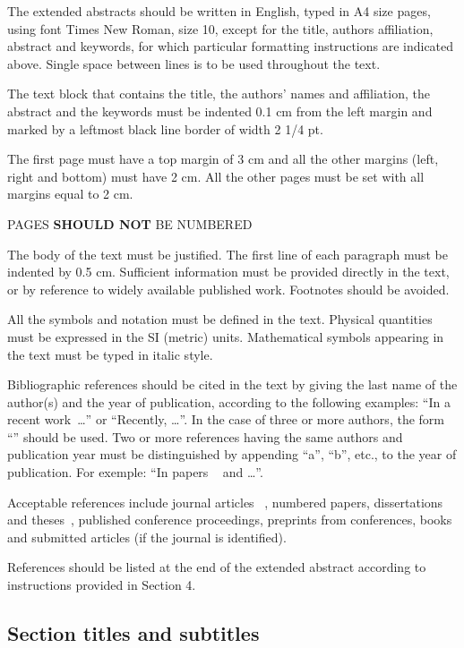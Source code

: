 \documentclass[10pt,fleqn,a4paper,twoside]{article}
\begin{document}
The extended abstracts should be written in English, typed in A4 size pages, using font Times New Roman, size 10, except for the title, authors affiliation, abstract and keywords, for which particular formatting instructions are indicated above. Single space between lines is to be used throughout the text.

The text block that contains the title, the authors' names and affiliation, the abstract and the keywords must be indented 0.1 cm from the left margin and marked by a leftmost black line border of width 2 1/4 pt.

The first page must have a top margin of 3 cm and all the other margins (left, right and bottom) must have 2 cm. All the other pages must be set with all margins equal to 2 cm.

PAGES {\bf SHOULD NOT} BE NUMBERED

The body of the text must be justified. The first line of each paragraph must be indented by 0.5 cm. Sufficient information must be provided directly in the text, or by reference to widely available published work. Footnotes should be avoided.

All the symbols and notation must be defined in the text. Physical quantities must be expressed in the SI (metric) units. Mathematical symbols appearing in the text must be typed in italic style.

Bibliographic references should be cited in the text by giving the last name of the author(s) and the year of publication, according to the following examples: ``In a recent work~\citep{BandarraFilho2011}\dots'' or ``Recently, \citet{BandarraFilho2011}\dots''. In the case of three or more authors, the form ``\citep{CavaliniJunior2015}'' should be used. Two or more references having the same authors and publication year must be distinguished by appending ``a'', ``b'', etc., to the year of publication. For exemple: ``In papers ~\citep{Santos2013a} and \citep{Santos2013b}\dots''.

Acceptable references include journal articles ~\citep{MLA04}, numbered papers, dissertations and theses~\citep{CavaliniJunior2013}, published conference proceedings, preprints from conferences, books~\citep{McConnell.Varoto.2008} and submitted articles (if the journal is identified). 

References should be listed at the end of the extended abstract according to instructions provided in Section 4.

\subsection{Section titles and subtitles}
\end{document}
